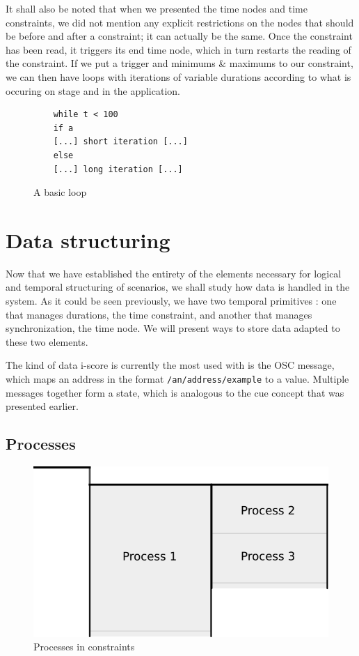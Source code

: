 \documentclass{sigchi}
\begin{document}
It shall also be noted that when we presented the time nodes and time constraints, we did not mention any explicit restrictions on the nodes that should be before and after a constraint; it can actually be the same. Once the constraint has been read, it triggers its end time node, which in turn restarts the reading of the constraint. If we put a trigger and minimums \& maximums to our constraint, we can then have loops with iterations of variable durations according to what is occuring on stage and in the application.

\begin{figure}
	\centering
	\begin{lstlisting}
	while t < 100
	if a
	[...] short iteration [...]
	else
	[...] long iteration [...]           
	\end{lstlisting}
	\caption{A basic loop}	
	\label{fig.loopcode}
\end{figure}

\section{Data structuring}
Now that we have established the entirety of the elements necessary for logical and temporal structuring of scenarios, we shall study how data is handled in the system.
As it could be seen previously, we have two temporal primitives : one that manages durations, the time constraint, and another that manages synchronization, the time node. We will present ways to store data adapted to these two elements.

The kind of data i-score is currently the most used with is the OSC message, which maps an address in the format \texttt{/an/address/example} to a value. Multiple messages together form a state, which is analogous to the cue concept that was presented earlier.

\subsection{Processes}

\begin{figure}[h]
    \centering
    \includegraphics[scale=0.5]{images/processes.png}
    \caption{Processes in constraints}
    \label{fig.processes} 
\end{figure}
\end{document}
